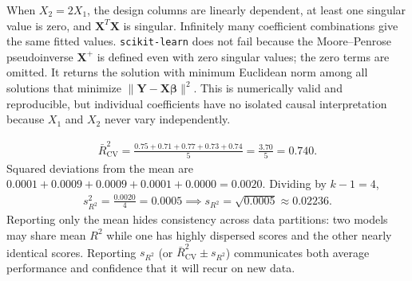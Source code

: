 \begin{solproblema}[prob:5ad88f8]
When $X_2=2X_1$, the design columns are linearly dependent, at least one singular value is zero, and $\mathbf X^T\mathbf X$ is singular. Infinitely many coefficient combinations give the same fitted values. \texttt{scikit-learn} does not fail because the Moore--Penrose pseudoinverse $\mathbf X^+$ is defined even with zero singular values; the zero terms are omitted. It returns the solution with minimum Euclidean norm among all solutions that minimize $\|\mathbf Y-\mathbf X\boldsymbol\beta\|^2$. This is numerically valid and reproducible, but individual coefficients have no isolated causal interpretation because $X_1$ and $X_2$ never vary independently.
\end{solproblema}

\begin{solproblema}
\begin{align}
\bar R_{\text{CV}}^2=\frac{0.75+0.71+0.77+0.73+0.74}{5}=\frac{3.70}{5}=0.740.
\end{align}
Squared deviations from the mean are $0.0001+0.0009+0.0009+0.0001+0.0000=0.0020$. Dividing by $k-1=4$,
\begin{align}
s_{R^2}^2=\frac{0.0020}{4}=0.0005\implies s_{R^2}=\sqrt{0.0005}\approx0.02236.
\end{align}
Reporting only the mean hides consistency across data partitions: two models may share mean $R^2$ while one has highly dispersed scores and the other nearly identical scores. Reporting $s_{R^2}$ (or $\bar R_{\text{CV}}^2\pm s_{R^2}$) communicates both average performance and confidence that it will recur on new data.
\end{solproblema}
